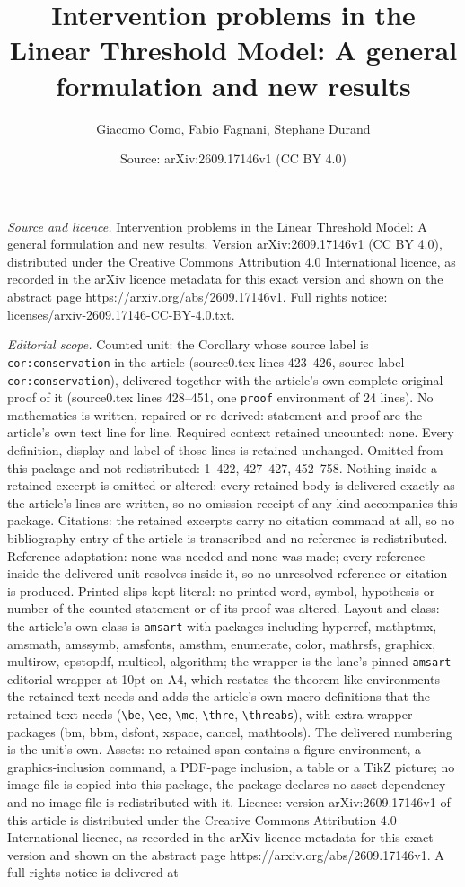 \documentclass[10pt,a4paper]{amsart}
\title[Intervention problems in the Linear Threshold Model: A gener]{Intervention problems in the Linear Threshold Model: A general formulation and new results}
\author{Giacomo Como, Fabio Fagnani, Stephane Durand}
\date{Source: arXiv:2609.17146v1 (CC BY 4.0)}
\begin{document}
\maketitle

\noindent\emph{Source and licence.} Intervention problems in the Linear Threshold Model: A general formulation and new results. Version arXiv:2609.17146v1 (CC BY 4.0), distributed under the Creative Commons Attribution 4.0 International licence, as recorded in the arXiv licence metadata for this exact version and shown on the abstract page https://arxiv.org/abs/2609.17146v1. Full rights notice: licenses/arxiv-2609.17146-CC-BY-4.0.txt.\par\smallskip

\noindent\textit{Editorial scope.} Counted unit: the Corollary whose source label is \texttt{cor:conservation} in the article (source0.tex lines 423--426, source label \texttt{cor:conservation}), delivered together with the article's own complete original proof of it (source0.tex lines 428--451, one \texttt{proof} environment of 24 lines). No mathematics is written, repaired or re-derived: statement and proof are the article's own text line for line. Required context retained uncounted: none. Every definition, display and label of those lines is retained unchanged. Omitted from this package and not redistributed: 1--422, 427--427, 452--758. Nothing inside a retained excerpt is omitted or altered: every retained body is delivered exactly as the article's lines are written, so no omission receipt of any kind accompanies this package. Citations: the retained excerpts carry no citation command at all, so no bibliography entry of the article is transcribed and no reference is redistributed. Reference adaptation: none was needed and none was made; every reference inside the delivered unit resolves inside it, so no unresolved reference or citation is produced. Printed slips kept literal: no printed word, symbol, hypothesis or number of the counted statement or of its proof was altered. Layout and class: the article's own class is \texttt{amsart} with packages including hyperref, mathptmx, amsmath, amssymb, amsfonts, amsthm, enumerate, color, mathrsfs, graphicx, multirow, epstopdf, multicol, algorithm; the wrapper is the lane's pinned \texttt{amsart} editorial wrapper at 10pt on A4, which restates the theorem-like environments the retained text needs and adds the article's own macro definitions that the retained text needs (\texttt{\textbackslash be}, \texttt{\textbackslash ee}, \texttt{\textbackslash mc}, \texttt{\textbackslash thre}, \texttt{\textbackslash threabs}), with extra wrapper packages (bm, bbm, dsfont, xspace, cancel, mathtools). The delivered numbering is the unit's own. Assets: no retained span contains a figure environment, a graphics-inclusion command, a PDF-page inclusion, a table or a TikZ picture; no image file is copied into this package, the package declares no asset dependency and no image file is redistributed with it. Licence: version arXiv:2609.17146v1 of this article is distributed under the Creative Commons Attribution 4.0 International licence, as recorded in the arXiv licence metadata for this exact version and shown on the abstract page https://arxiv.org/abs/2609.17146v1. A full rights notice is delivered at 
\end{document}
